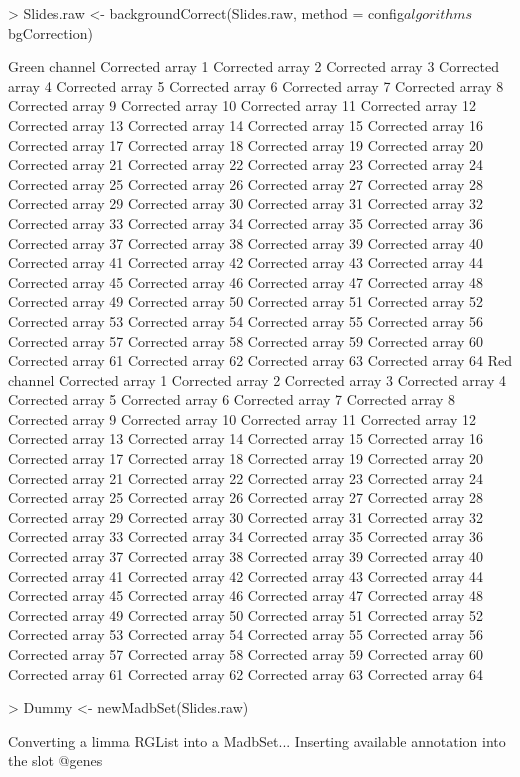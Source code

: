 \documentclass[titlepage]{article}
\begin{document}
\begin{Schunk}
\begin{Sinput}
> Slides.raw <- backgroundCorrect(Slides.raw, method = config$algorithms$bgCorrection)
\end{Sinput}
\begin{Soutput}
Green channel
Corrected array 1 
Corrected array 2 
Corrected array 3 
Corrected array 4 
Corrected array 5 
Corrected array 6 
Corrected array 7 
Corrected array 8 
Corrected array 9 
Corrected array 10 
Corrected array 11 
Corrected array 12 
Corrected array 13 
Corrected array 14 
Corrected array 15 
Corrected array 16 
Corrected array 17 
Corrected array 18 
Corrected array 19 
Corrected array 20 
Corrected array 21 
Corrected array 22 
Corrected array 23 
Corrected array 24 
Corrected array 25 
Corrected array 26 
Corrected array 27 
Corrected array 28 
Corrected array 29 
Corrected array 30 
Corrected array 31 
Corrected array 32 
Corrected array 33 
Corrected array 34 
Corrected array 35 
Corrected array 36 
Corrected array 37 
Corrected array 38 
Corrected array 39 
Corrected array 40 
Corrected array 41 
Corrected array 42 
Corrected array 43 
Corrected array 44 
Corrected array 45 
Corrected array 46 
Corrected array 47 
Corrected array 48 
Corrected array 49 
Corrected array 50 
Corrected array 51 
Corrected array 52 
Corrected array 53 
Corrected array 54 
Corrected array 55 
Corrected array 56 
Corrected array 57 
Corrected array 58 
Corrected array 59 
Corrected array 60 
Corrected array 61 
Corrected array 62 
Corrected array 63 
Corrected array 64 
Red channel
Corrected array 1 
Corrected array 2 
Corrected array 3 
Corrected array 4 
Corrected array 5 
Corrected array 6 
Corrected array 7 
Corrected array 8 
Corrected array 9 
Corrected array 10 
Corrected array 11 
Corrected array 12 
Corrected array 13 
Corrected array 14 
Corrected array 15 
Corrected array 16 
Corrected array 17 
Corrected array 18 
Corrected array 19 
Corrected array 20 
Corrected array 21 
Corrected array 22 
Corrected array 23 
Corrected array 24 
Corrected array 25 
Corrected array 26 
Corrected array 27 
Corrected array 28 
Corrected array 29 
Corrected array 30 
Corrected array 31 
Corrected array 32 
Corrected array 33 
Corrected array 34 
Corrected array 35 
Corrected array 36 
Corrected array 37 
Corrected array 38 
Corrected array 39 
Corrected array 40 
Corrected array 41 
Corrected array 42 
Corrected array 43 
Corrected array 44 
Corrected array 45 
Corrected array 46 
Corrected array 47 
Corrected array 48 
Corrected array 49 
Corrected array 50 
Corrected array 51 
Corrected array 52 
Corrected array 53 
Corrected array 54 
Corrected array 55 
Corrected array 56 
Corrected array 57 
Corrected array 58 
Corrected array 59 
Corrected array 60 
Corrected array 61 
Corrected array 62 
Corrected array 63 
Corrected array 64 
\end{Soutput}
\begin{Sinput}
> Dummy <- newMadbSet(Slides.raw)
\end{Sinput}
\begin{Soutput}
Converting a limma RGList into a MadbSet...
Inserting available annotation into the slot @genes


\end{Soutput}
\end{Schunk}
\end{document}
